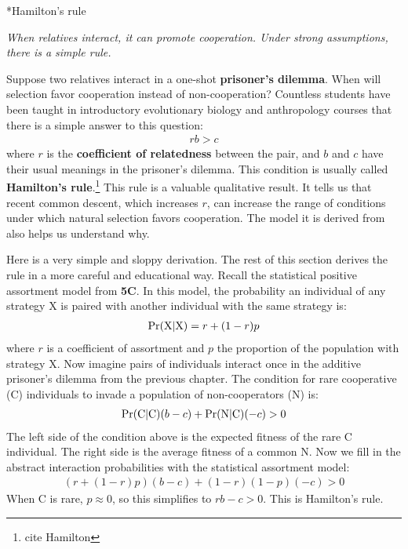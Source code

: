 \documentclass[10pt,reqno]{amsbook}
\makeatletter
\newcommand{\bemph}[1]{{\textbf{\textcolor{bemphcol}{#1}}}}
\renewcommand\section{\@startsection{section}{1}
\z@{.7\linespacing\@plus\linespacing}{.5\linespacing}
{\large\bfseries\itshape}}
\numberwithin{equation}{chapter}
\newenvironment{precis}
{\noi\itshape}
{\vspace{6pt}}
\newcommand{\noi}{\noindent}
\makeatother
\begin{document}
\section*{Hamilton's rule}

\begin{precis}When relatives interact, it can promote cooperation. Under strong assumptions, there is a simple rule.\end{precis}

Suppose two relatives interact in a one-shot \bemph{prisoner's dilemma}. When will selection favor cooperation instead of non-cooperation? Countless students have been taught in introductory evolutionary biology and anthropology courses that there is a simple answer to this question:
\begin{align*}
	r b > c
\end{align*}
where $r$ is the \bemph{coefficient of relatedness} between the pair, and $b$ and $c$ have their usual meanings in the prisoner's dilemma. This condition is usually called \bemph{Hamilton's rule}.\footnote{cite Hamilton} This rule is a valuable qualitative result. It tells us that recent common descent, which increases $r$, can increase the range of conditions under which natural selection favors cooperation. The model it is derived from also helps us understand why.

Here is a very simple and sloppy derivation. The rest of this section derives the rule in a more careful and educational way. Recall the statistical positive assortment model from \bemph{5C}. In this model, the probability an individual of any strategy X is paired with another individual with the same strategy is:
\begin{align*}
	\Pr(\text X|\text X) = r + (1-r)p
\end{align*}
where $r$ is a coefficient of assortment and $p$ the proportion of the population with strategy X. Now imagine pairs of individuals interact once in the additive prisoner's dilemma from the previous chapter. The condition for rare cooperative (C) individuals to invade a population of non-cooperators (N) is:
\begin{align*}
	\Pr(\text C|\text C) (b-c) + \Pr(\text N|\text C)(-c) > 0
\end{align*}
The left side of the condition above is the expected fitness of the rare C individual. The right side is the average fitness of a common N. Now we fill in the abstract interaction probabilities with the statistical assortment model:
\begin{align*}
	(r+(1-r)p) (b-c) + (1-r)(1-p)(-c) > 0
\end{align*}
When C is rare, $p \approx 0$, so this simplifies to $rb-c>0$. This is Hamilton's rule.
\end{document}
